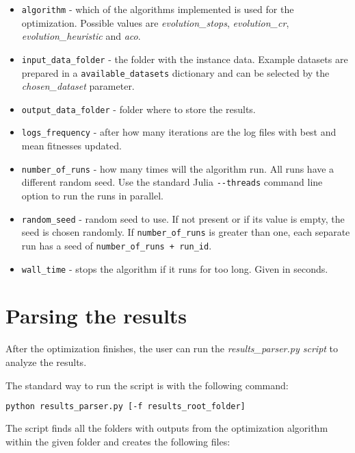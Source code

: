 \begin{itemize}
    \setlength\itemsep{0pt}
    \item \texttt{algorithm} - which of the algorithms implemented is used for the optimization. Possible values are \textit{evolution\_stops}, \textit{evolution\_cr}, \textit{evolution\_heuristic} and \textit{aco}.
    \item \texttt{input\_data\_folder} - the folder with the instance data. Example datasets are prepared in a \texttt{available\_datasets} dictionary and can be selected by the \textit{chosen\_dataset} parameter.
    \item \texttt{output\_data\_folder} - folder where to store the results.
    \item \texttt{logs\_frequency} - after how many iterations are the log files with best and mean fitnesses updated.
    \item \texttt{number\_of\_runs} - how many times will the algorithm run. All runs have a different random seed. Use the standard Julia \texttt{-{}-threads} command line option to run the runs in parallel.
    \item \texttt{random\_seed} - random seed to use. If not present or if its value is empty, the seed is chosen randomly. If \texttt{number\_of\_runs} is greater than one, each separate run has a seed of \texttt{number\_of\_runs + run\_id}. 
    \item \texttt{wall\_time} - stops the algorithm if it runs for too long. Given in seconds. 
\end{itemize}

\section{Parsing the results}

After the optimization finishes, the user can run the \textit{results\_parser.py script} to analyze the results.

The standard way to run the script is with the following command:

\begin{lstlisting}[language=bash]
    python results_parser.py [-f results_root_folder] 
\end{lstlisting}

The script finds all the folders with outputs from the optimization algorithm within the given folder and creates the following files:

